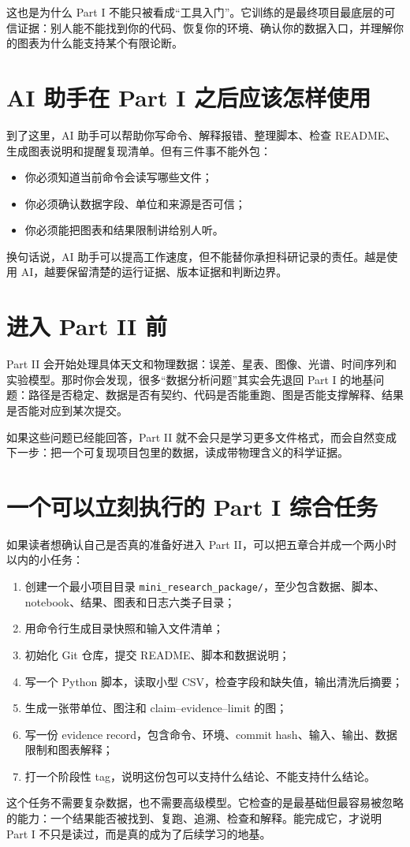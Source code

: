 这也是为什么 Part I 不能只被看成“工具入门”。它训练的是最终项目最底层的可信证据：别人能不能找到你的代码、恢复你的环境、确认你的数据入口，并理解你的图表为什么能支持某个有限论断。

\section*{AI 助手在 Part I 之后应该怎样使用}

到了这里，AI 助手可以帮助你写命令、解释报错、整理脚本、检查 README、生成图表说明和提醒复现清单。但有三件事不能外包：

\begin{itemize}
    \item 你必须知道当前命令会读写哪些文件；
    \item 你必须确认数据字段、单位和来源是否可信；
    \item 你必须能把图表和结果限制讲给别人听。
\end{itemize}

换句话说，AI 助手可以提高工作速度，但不能替你承担科研记录的责任。越是使用 AI，越要保留清楚的运行证据、版本证据和判断边界。

\section*{进入 Part II 前}

Part II 会开始处理具体天文和物理数据：误差、星表、图像、光谱、时间序列和实验模型。那时你会发现，很多“数据分析问题”其实会先退回 Part I 的地基问题：路径是否稳定、数据是否有契约、代码是否能重跑、图是否能支撑解释、结果是否能对应到某次提交。

如果这些问题已经能回答，Part II 就不会只是学习更多文件格式，而会自然变成下一步：把一个可复现项目包里的数据，读成带物理含义的科学证据。

\section*{一个可以立刻执行的 Part I 综合任务}

如果读者想确认自己是否真的准备好进入 Part II，可以把五章合并成一个两小时以内的小任务：

\begin{enumerate}
    \item 创建一个最小项目目录 \texttt{mini\_research\_package/}，至少包含数据、脚本、notebook、结果、图表和日志六类子目录；
    \item 用命令行生成目录快照和输入文件清单；
    \item 初始化 Git 仓库，提交 README、脚本和数据说明；
    \item 写一个 Python 脚本，读取小型 CSV，检查字段和缺失值，输出清洗后摘要；
    \item 生成一张带单位、图注和 claim--evidence--limit 的图；
    \item 写一份 evidence record，包含命令、环境、commit hash、输入、输出、数据限制和图表解释；
    \item 打一个阶段性 tag，说明这份包可以支持什么结论、不能支持什么结论。
\end{enumerate}

这个任务不需要复杂数据，也不需要高级模型。它检查的是最基础但最容易被忽略的能力：一个结果能否被找到、复跑、追溯、检查和解释。能完成它，才说明 Part I 不只是读过，而是真的成为了后续学习的地基。
